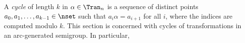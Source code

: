 A \emph{cycle} of length $k$ in $\alpha\in \Tran_n$ is a sequence of distinct
points $a_0, a_1, \dots, a_{k-1}\in\nset$ such that $a_i \alpha = a_{i+1}$ for
all $i$, where the indices are computed modulo $k$. This section is concerned
with cycles of transformations in an arc-generated semigroup. In particular,